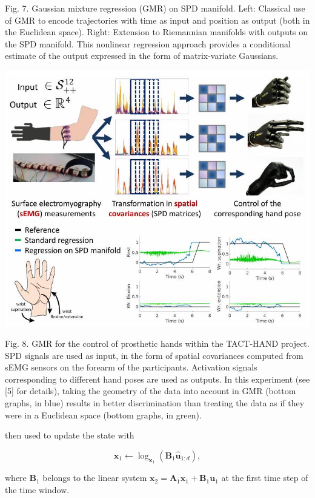 \documentclass[10pt]{article}
\begin{document}
Fig. 7. Gaussian mixture regression (GMR) on SPD manifold. Left: Classical use of GMR to encode trajectories with time as input and position as output (both in the Euclidean space). Right: Extension to Riemannian manifolds with outputs on the SPD manifold. This nonlinear regression approach provides a conditional estimate of the output expressed in the form of matrix-variate Gaussians.

\begin{center}
\includegraphics[max width=\textwidth]{2023_01_25_b4240e152b7ba97a594cg-07(1)}
\end{center}

Fig. 8. GMR for the control of prosthetic hands within the TACT-HAND project. SPD signals are used as input, in the form of spatial covariances computed from sEMG sensors on the forearm of the participants. Activation signals corresponding to different hand poses are used as outputs. In this experiment (see [5] for details), taking the geometry of the data into account in GMR (bottom graphs, in blue) results in better discrimination than treating the data as if they were in a Euclidean space (bottom graphs, in green).

then used to update the state with

$$
\boldsymbol{x}_{1} \leftarrow \log _{\boldsymbol{x}_{1}}\left(\boldsymbol{B}_{1} \hat{\boldsymbol{u}}_{1: d}\right),
$$

where $\boldsymbol{B}_{1}$ belongs to the linear system $\boldsymbol{x}_{2}=\boldsymbol{A}_{1} \boldsymbol{x}_{1}+\boldsymbol{B}_{1} \boldsymbol{u}_{1}$ at the first time step of the time window.
\end{document}
